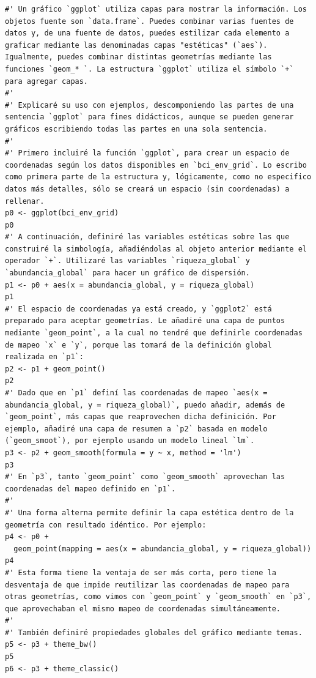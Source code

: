 \documentclass[11pt,]{article}
\begin{document}
\begin{verbatim}
#' Un gráfico `ggplot` utiliza capas para mostrar la información. Los objetos fuente son `data.frame`. Puedes combinar varias fuentes de datos y, de una fuente de datos, puedes estilizar cada elemento a graficar mediante las denominadas capas "estéticas" (`aes`). Igualmente, puedes combinar distintas geometrías mediante las funciones `geom_* `. La estructura `ggplot` utiliza el símbolo `+` para agregar capas.
#' 
#' Explicaré su uso con ejemplos, descomponiendo las partes de una sentencia `ggplot` para fines didácticos, aunque se pueden generar gráficos escribiendo todas las partes en una sola sentencia.
#' 
#' Primero incluiré la función `ggplot`, para crear un espacio de coordenadas según los datos disponibles en `bci_env_grid`. Lo escribo como primera parte de la estructura y, lógicamente, como no especifico datos más detalles, sólo se creará un espacio (sin coordenadas) a rellenar.
p0 <- ggplot(bci_env_grid)
p0
#' A continuación, definiré las variables estéticas sobre las que construiré la simbología, añadiéndolas al objeto anterior mediante el operador `+`. Utilizaré las variables `riqueza_global` y `abundancia_global` para hacer un gráfico de dispersión.
p1 <- p0 + aes(x = abundancia_global, y = riqueza_global)
p1
#' El espacio de coordenadas ya está creado, y `ggplot2` está preparado para aceptar geometrías. Le añadiré una capa de puntos mediante `geom_point`, a la cual no tendré que definirle coordenadas de mapeo `x` e `y`, porque las tomará de la definición global realizada en `p1`:
p2 <- p1 + geom_point()
p2
#' Dado que en `p1` definí las coordenadas de mapeo `aes(x = abundancia_global, y = riqueza_global)`, puedo añadir, además de `geom_point`, más capas que reaprovechen dicha definición. Por ejemplo, añadiré una capa de resumen a `p2` basada en modelo (`geom_smoot`), por ejemplo usando un modelo lineal `lm`.
p3 <- p2 + geom_smooth(formula = y ~ x, method = 'lm')
p3
#' En `p3`, tanto `geom_point` como `geom_smooth` aprovechan las coordenadas del mapeo definido en `p1`.
#' 
#' Una forma alterna permite definir la capa estética dentro de la geometría con resultado idéntico. Por ejemplo:
p4 <- p0 +
  geom_point(mapping = aes(x = abundancia_global, y = riqueza_global))
p4
#' Esta forma tiene la ventaja de ser más corta, pero tiene la desventaja de que impide reutilizar las coordenadas de mapeo para otras geometrías, como vimos con `geom_point` y `geom_smooth` en `p3`, que aprovechaban el mismo mapeo de coordenadas simultáneamente.
#' 
#' También definiré propiedades globales del gráfico mediante temas.
p5 <- p3 + theme_bw()
p5
p6 <- p3 + theme_classic()

\end{verbatim}
\end{document}

